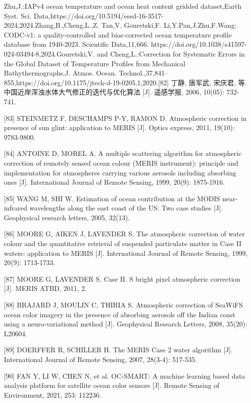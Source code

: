 \documentclass[
  12pt,
]{article}
\begin{document}
Zhu,J.:IAPv4 ocean temperature and ocean heat content gridded
dataset,Earth Syst. Sci.
Data,https://doi.org/10.5194/essd-16-3517-2024,2024.Zhang,B.,Cheng,L.,Z.
Tan,V. Gouretski,F. Li,Y.Pan,J.Zhu,F.Wang: CODC-v1: a quality-controlled
and bias-corrected ocean temperature profile database from 1940-2023.
Scientific Data,11,666.
https://doi.org/10.1038/s41597-024-03494-8,2024.Gouretski,V. and
Cheng,L.:Correction for Systematic Errors in the Global Dataset of
Temperature Profiles from Mechanical Bathythermographs,J. Atmos. Ocean.
Technol.,37,841--855,https://doi.org/10.1175/jtech-d-19-0205.1,2020.{[}82{]}
丁静, 唐军武, 宋庆君, 等. 中国近岸浑浊水体大气修正的迭代与优化算法
{[}J{]}. 遥感学报, 2006, 10(05): 732-741.

{[}83{]} STEINMETZ F, DESCHAMPS P-Y, RAMON D. Atmospheric correction in
presence of sun glint: application to MERIS {[}J{]}. Optics express,
2011, 19(10): 9783-9800.

{[}84{]} ANTOINE D, MOREL A. A multiple scattering algorithm for
atmospheric correction of remotely sensed ocean colour (MERIS
instrument): principle and implementation for atmospheres carrying
various aerosols including absorbing ones {[}J{]}. International Journal
of Remote Sensing, 1999, 20(9): 1875-1916.

{[}85{]} WANG M, SHI W. Estimation of ocean contribution at the MODIS
near‐infrared wavelengths along the east coast of the US: Two case
studies {[}J{]}. Geophysical research letters, 2005, 32(13).

{[}86{]} MOORE G, AIKEN J, LAVENDER S. The atmospheric correction of
water colour and the quantitative retrieval of suspended particulate
matter in Case II waters: application to MERIS {[}J{]}. International
Journal of Remote Sensing, 1999, 20(9): 1713-1733.

{[}87{]} MOORE G, LAVENDER S. Case II. S bright pixel atmospheric
correction {[}J{]}. MERIS ATBD, 2011, 2.

{[}88{]} BRAJARD J, MOULIN C, THIRIA S. Atmospheric correction of
SeaWiFS ocean color imagery in the presence of absorbing aerosols off
the Indian coast using a neuro-variational method {[}J{]}. Geophysical
Research Letters, 2008, 35(20): L20604.

{[}89{]} DOERFFER R, SCHILLER H. The MERIS Case 2 water algorithm
{[}J{]}. International Journal of Remote Sensing, 2007, 28(3-4):
517-535.

{[}90{]} FAN Y, LI W, CHEN N, et al. OC-SMART: A machine learning based
data analysis platform for satellite ocean color sensors {[}J{]}. Remote
Sensing of Environment, 2021, 253: 112236.
\end{document}
